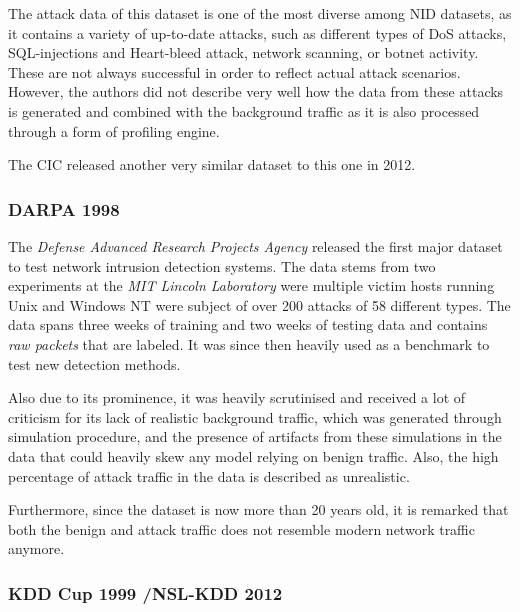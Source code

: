 \documentclass[a4paper,12pt,twoside]{report}
\begin{document}
The attack data of this dataset is one of the most diverse among NID datasets, as it contains a variety of up-to-date attacks, such as different types of DoS attacks, SQL-injections and Heart-bleed attack, network scanning, or botnet activity. These are not always successful in order to reflect actual attack scenarios. However, the authors did not describe very well how the data from these attacks is generated and combined with the background traffic as it is also processed through a form of profiling engine. 

The CIC released another very similar dataset to this one in 2012.

\subsubsection*{DARPA 1998 \cite{lippmann2000evaluating}}

The \textit{Defense Advanced Research Projects Agency} released the first major dataset to test network intrusion detection systems. The data stems from two experiments at the \textit{MIT Lincoln Laboratory} were multiple victim hosts running Unix and Windows NT were subject of over 200 attacks of 58 different types. The data spans three weeks of training and two weeks of testing data and contains \textit{raw packets} that are labeled. It was since then heavily used as a benchmark to test new detection methods. %

Also due to its prominence, it was heavily scrutinised and received a lot of criticism for its lack of realistic background traffic, which was generated through simulation procedure, and the presence of artifacts from these simulations in the data that could heavily skew any model relying on benign traffic. Also, the high percentage of attack traffic in the data is described as unrealistic.

Furthermore, since the dataset is now more than 20 years old, it is remarked that both the benign and attack traffic does not resemble modern network traffic anymore. 

\subsubsection*{KDD Cup 1999 \cite{cup1999data,cup1999dataset}/NSL-KDD 2012 \cite{tavallaee2012nsl}}
\end{document}
